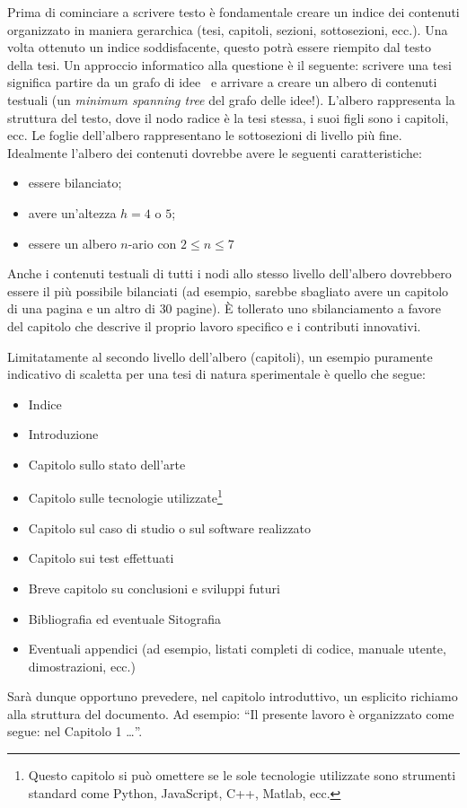 \documentclass[12pt]{report}
\begin{document}
Prima di cominciare a scrivere testo \`e fondamentale creare un indice dei contenuti organizzato in maniera gerarchica (tesi, capitoli, sezioni, sottosezioni, ecc.). Una volta ottenuto un indice soddisfacente, questo potr\`a essere riempito dal testo della tesi. 
Un approccio informatico alla questione \`e il seguente: scrivere una tesi significa partire da un grafo di idee~\cite{hamalainen2019web} e arrivare a creare un albero di contenuti testuali (un \textit{minimum spanning tree} del grafo delle idee!). L'albero rappresenta la struttura del testo, dove il nodo radice \`e la tesi stessa, i suoi figli sono i capitoli, ecc. Le foglie dell'albero rappresentano le sottosezioni di livello pi\`u fine.  
%
Idealmente l'albero dei contenuti dovrebbe avere le seguenti caratteristiche:
\begin{itemize}
\item essere bilanciato;
\item avere un'altezza $h=4$ o $5$; 
\item essere un albero $n$-ario con $2\leq n \leq 7$
\end{itemize}
Anche i contenuti testuali di tutti i nodi allo stesso livello dell'albero dovrebbero essere il pi\`u possibile bilanciati (ad esempio, sarebbe sbagliato avere un capitolo di una pagina e un altro di $30$ pagine).
\`{E} tollerato uno sbilanciamento a favore del capitolo che descrive il proprio lavoro specifico e i  contributi innovativi.

Limitatamente al secondo livello dell'albero (capitoli), un esempio puramente indicativo di scaletta per una tesi di natura sperimentale è quello che segue:
\begin{itemize}
    \item Indice
    \item Introduzione
    \item Capitolo sullo stato dell'arte
    \item Capitolo sulle tecnologie utilizzate\footnote{Questo capitolo si può omettere se le sole tecnologie utilizzate sono strumenti standard come Python, JavaScript, C++, Matlab, ecc.}
    \item Capitolo sul caso di studio o sul software realizzato
    \item Capitolo sui test effettuati
    \item Breve capitolo su conclusioni e sviluppi futuri
    \item Bibliografia ed eventuale Sitografia
    \item Eventuali appendici (ad esempio, listati completi di codice, manuale utente, dimostrazioni, ecc.)
\end{itemize}
Sarà dunque opportuno prevedere, nel capitolo introduttivo, un esplicito richiamo alla struttura del documento. Ad esempio: ``Il presente lavoro \`{e} organizzato come segue: nel Capitolo 1 \dots''.
\end{document}
